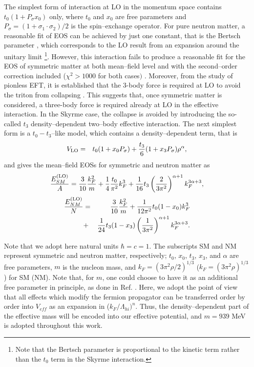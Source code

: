 \documentclass[aps,11pt,prc,preprint,superscriptaddress,nofootinbib]{revtex4}
\begin{document}
The simplest form of interaction at LO in the momentum space
contains $t_{0}(1+P_{\sigma }x_{0})$ only, where $t_{0}$ and $x_{0}$ are free
parameters and $P_{\sigma }=(1+\sigma _{1}\cdot \sigma _{2})/2$ is the spin--exchange 
operator. For pure neutron matter, a reasonable fit of EOS can be achieved by just one constant, that is the Bertsch parameter  \cite{bertsch}, which corresponds to the LO result from an expansion around the unitary limit \cite{denis17,denis1}\footnote{Note that the Bertsch parameter is proportional to the kinetic term rather than the $t_0$ term in the Skyrme interaction.}.
However, this interaction fails to produce
a reasonable fit for the EOS of symmetric matter at both mean--field
level and with the second--order correction included ($\chi ^{2}>1000$ for both
cases$)$ \cite{bira}. Moreover, from the study of pionless EFT, it is established that the 3-body force is required at LO to avoid the triton from collapsing \cite{3f}. This suggests that, once symmetric matter is considered, 
a three-body force 
 is required already at LO in the effective interaction. In the Skyrme case, 
 the collapse is avoided by introducing the so-called $t_3$ density--dependent two--body effective interaction. 
The next simplest form is a $t_{0}-t_{3}$--like model,
which contains a density--dependent term, that is 
\begin{eqnarray}
V_{\rm LO}&=& t_0(1+x_0P_{\sigma})
+\frac{t_3}{6} (1+x_3P_{\sigma}) \rho^{\alpha}, 
\label{vlo}
\end{eqnarray}
and gives the mean--field EOSs for symmetric and neutron matter as%
\begin{equation}
\frac{E_{SM}^{\rm (LO)}}{A}=\frac{3}{10}\frac{k_{F}^{2}}{m}+\frac{1}{4}\frac{t_{0}%
}{\pi ^{2}}k_{F}^{3}+\frac{1}{16}t_{3}\left( \frac{2}{3\pi ^{2}}\right)
^{\alpha +1}k_{F}^{3\alpha +3},  \label{meanfieldsm}
\end{equation}%
\begin{eqnarray}
\frac{E_{NM}^{\rm (LO)}}{N} &=&\frac{3}{10}\frac{k_{F}^{2}}{m}+\frac{1}{12\pi ^{2}%
}t_{0}(1-x_{0})k_{F}^{3}  \notag \\
&+&\frac{1}{24}t_{3}(1-x_{3})\left( \frac{1}{3\pi ^{2}}\right) ^{\alpha
+1}k_{F}^{3\alpha +3}.  \label{meanfieldnm}
\end{eqnarray}

Note that we adopt here natural units $\hbar=c=1$. 
The subscripts SM and NM represent symmetric and neutron matter, respectively; $t_0$, $x_0$,
$t_{3}$, $x_{3} $, and $\alpha $ are free parameters, $m$ is the nucleon mass, and    
$k_{F}=(3\pi ^{2}\rho/2)^{1/3}$ ($k_{F}=(3\pi ^{2}\rho )^{1/3}$) for SM (NM).
Note that, for $m$, one could choose to have it as an additional free
parameter in principle, as done in Ref. \cite{bira}.
Here, we adopt the point of view that all effects which modify the fermion propagator
can be transferred order by order into $V_{eff}$ as an expansion in ($%
k_{F}/\Lambda _{hi})^{n}$. Thus, the density--dependent part of the effective
mass will be encoded into our effective potential, and $m=939$ MeV is
adopted throughout this work. 
\end{document}
